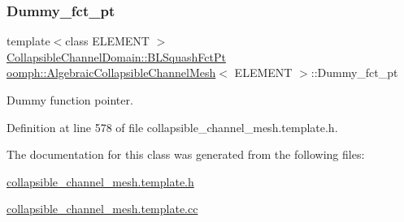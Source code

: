 \subsubsection{\texorpdfstring{Dummy\+\_\+fct\+\_\+pt}{Dummy\_fct\_pt}}
{\footnotesize\ttfamily template$<$class E\+L\+E\+M\+E\+NT $>$ \\
\hyperlink{classoomph_1_1CollapsibleChannelDomain_a2bf1d7943bfac134a5c27a54c7e1faed}{Collapsible\+Channel\+Domain\+::\+B\+L\+Squash\+Fct\+Pt} \hyperlink{classoomph_1_1AlgebraicCollapsibleChannelMesh}{oomph\+::\+Algebraic\+Collapsible\+Channel\+Mesh}$<$ E\+L\+E\+M\+E\+NT $>$\+::Dummy\+\_\+fct\+\_\+pt\hspace{0.3cm}{\ttfamily [protected]}}



Dummy function pointer. 



Definition at line 578 of file collapsible\+\_\+channel\+\_\+mesh.\+template.\+h.



The documentation for this class was generated from the following files\+:\begin{DoxyCompactItemize}
\item 
\hyperlink{collapsible__channel__mesh_8template_8h}{collapsible\+\_\+channel\+\_\+mesh.\+template.\+h}\item 
\hyperlink{collapsible__channel__mesh_8template_8cc}{collapsible\+\_\+channel\+\_\+mesh.\+template.\+cc}\end{DoxyCompactItemize}
